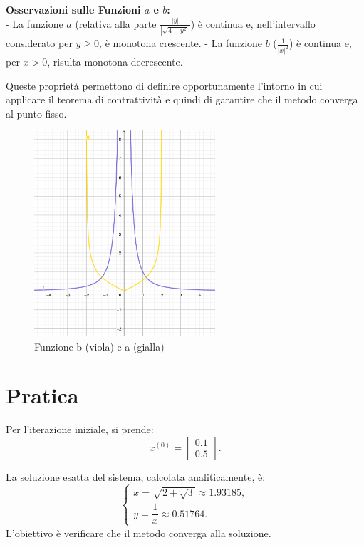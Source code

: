 \documentclass[11pt]{article}
\begin{document}
\vspace{1em}
\textbf{Osservazioni sulle Funzioni \(a\) e \(b\):}\\  
- La funzione \(a\) (relativa alla parte \(\frac{|y|}{\left|\sqrt{4-y^2}\right|}\)) è continua e, nell'intervallo considerato per \(y\ge0\), è monotona crescente.  
- La funzione \(b\) (\(\frac{1}{|x|^2}\)) è continua e, per \(x>0\), risulta monotona decrescente.  

Queste proprietà permettono di definire opportunamente l'intorno in cui applicare il teorema di contrattività e quindi di garantire che il metodo converga al punto fisso.

\begin{figure}[H]
  \centering
  \includegraphics[width=0.6\textwidth]{images/grafico.png}
  \caption{Funzione b (viola) e a (gialla)}
  \label{fig:funzioni}
\end{figure}


\section*{Pratica}
Per l'iterazione iniziale, si prende:
\[
  x^{(0)} = \begin{bmatrix} 0.1 \\ 0.5 \end{bmatrix}.
\]

La soluzione esatta del sistema, calcolata analiticamente, è:
\[
\begin{cases}
  x = \sqrt{2 + \sqrt{3}} \approx 1.93185, \\
  y = \dfrac{1}{x} \approx 0.51764.
\end{cases}
\]
L'obiettivo è verificare che il metodo converga alla soluzione.
\end{document}
